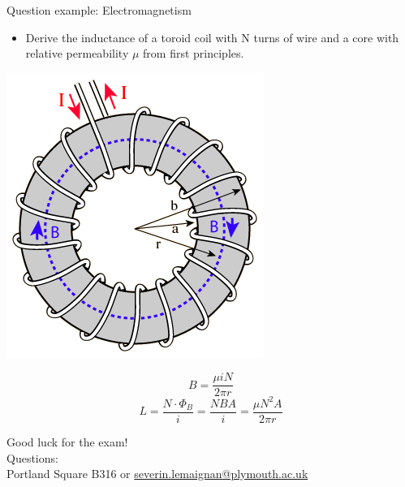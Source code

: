 \documentclass[compress]{beamer}
\begin{document}
\begin{frame}{Question example: Electromagnetism}

    \begin{itemize}
        \item Derive the inductance of a toroid coil with N turns of wire and a
            core with relative permeability $\mu$ from first principles.
    \end{itemize}
    

    \begin{center}
        \includegraphics[width=0.3\linewidth]{toroid2}
    \end{center}

    \[
    B=\frac{\mu i N}{2\pi r}
    \]
    \[
    L = \frac{N \cdot \Phi_B}{i} = \frac{N B A}{i} = \frac{\mu N^2 A}{2\pi r}
    \]

\end{frame}

\begin{frame}{}
    \begin{center}
        \Large
        Good luck for the exam!\\[2em]
        \normalsize
        Questions:\\
        Portland Square B316 or \url{severin.lemaignan@plymouth.ac.uk} \\[1em]

    \end{center}
\end{frame}
\end{document}
